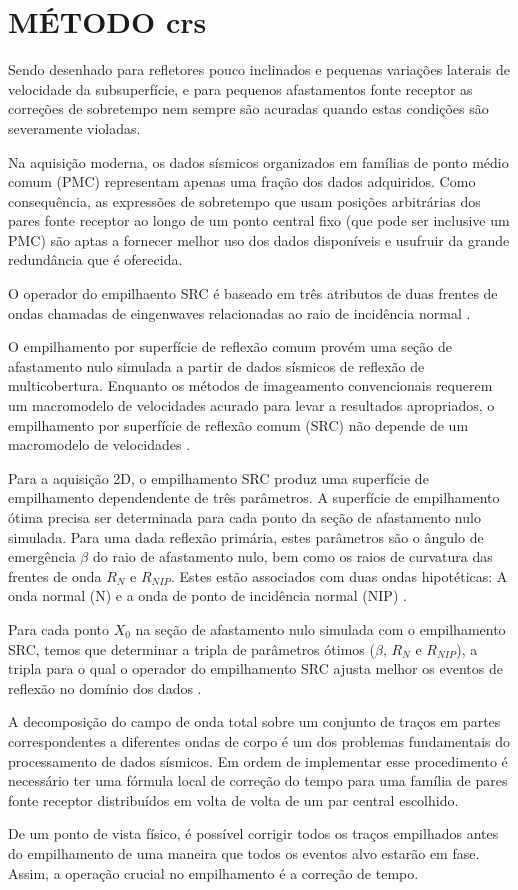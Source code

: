 \chapter{MÉTODO crs}
\label{cap1}


Sendo desenhado para refletores pouco inclinados e pequenas variações laterais de velocidade da subsuperfície, e
para pequenos afastamentos fonte receptor as correções de sobretempo nem sempre são acuradas quando estas condições
são severamente violadas. \cite{tygel}

Na aquisição moderna, os dados sísmicos organizados em famílias de ponto médio comum (PMC) representam apenas uma fração
dos dados adquiridos. Como consequência, as expressões de sobretempo que usam posições arbitrárias dos pares fonte receptor
ao longo de um ponto central fixo (que pode ser inclusive um PMC) são aptas a fornecer melhor uso dos dados disponíveis
e usufruir da grande redundância que é oferecida. \cite{tygel}

O operador do empilhaento SRC é baseado em três atributos de duas frentes de ondas chamadas de eingenwaves
relacionadas ao raio de incidência normal \cite{hubral}.

O empilhamento por superfície de reflexão comum provém uma seção de afastamento nulo simulada a partir de dados sísmicos
de reflexão de multicobertura. Enquanto os métodos de imageamento convencionais requerem um macromodelo de velocidades
acurado para levar a resultados apropriados, o empilhamento por superfície de reflexão comum (SRC) não depende de um
macromodelo de velocidades \cite{jager}.

Para a aquisição 2D, o empilhamento SRC produz uma superfície de empilhamento dependendente de três parâmetros.
A superfície de empilhamento ótima precisa ser determinada para cada ponto da seção de afastamento nulo simulada.
Para uma dada reflexão primária, estes parâmetros são o ângulo de emergência $\beta$ do raio de afastamento nulo, bem como
os raios de curvatura das frentes de onda $R_N$ e $R_{NIP}$. Estes estão associados com duas ondas hipotéticas:
A onda normal (N) e a onda de ponto de incidência normal (NIP) \cite{jager}.

Para cada ponto $X_0$ na seção de afastamento nulo simulada com o empilhamento SRC, temos que determinar a tripla de
parâmetros ótimos ($\beta$, $R_N$ e $R_{NIP}$), a tripla para o qual o operador do empilhamento SRC ajusta melhor
os eventos de reflexão no domínio dos dados \cite{jager}.

A decomposição do campo de onda total sobre um conjunto de traços em partes correspondentes a diferentes ondas
de corpo é um dos problemas fundamentais do processamento de dados sísmicos. 
Em ordem de implementar esse procedimento é necessário
ter uma fórmula local de correção do tempo para uma família de pares fonte receptor distribuídos em volta de volta
de um par central escolhido.\cite{gelpart1}

De um ponto de vista físico, é possível corrigir todos os traços empilhados antes do empilhamento de uma maneira
que todos os eventos alvo estarão em fase. Assim, a operação crucial no empilhamento é a correção de tempo.\cite{gelpart1}
